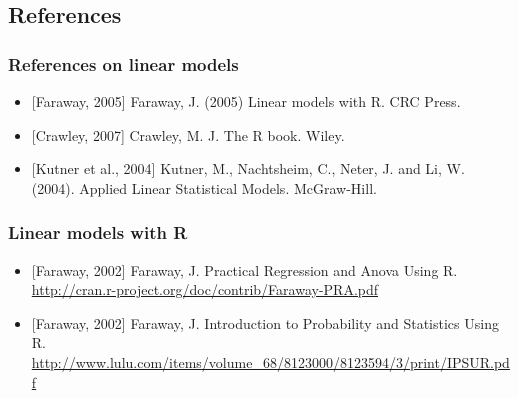 \subsection{References}


\begin{frame}
\frametitle{References on linear models}

\begin{itemize}
 \item \small [Faraway, 2005] Faraway, J. (2005) Linear models with R. CRC Press.
 \item \small [Crawley, 2007] Crawley, M. J. The R book. Wiley.
 \item \small [Kutner et al., 2004] Kutner, M., Nachtsheim, C., Neter, J. and Li, W. (2004).
Applied Linear Statistical Models. McGraw-Hill.

 \end{itemize}
\end{frame}


\begin{frame}
\frametitle{Linear models with R}

\begin{itemize}
 \item \small [Faraway, 2002] Faraway, J. Practical Regression and Anova Using R.
 \url{http://cran.r-project.org/doc/contrib/Faraway-PRA.pdf}

 \item \small [Faraway, 2002] Faraway, J. Introduction to Probability and Statistics Using R.
 \url{http://www.lulu.com/items/volume_68/8123000/8123594/3/print/IPSUR.pdf}

 \end{itemize}
\end{frame}

